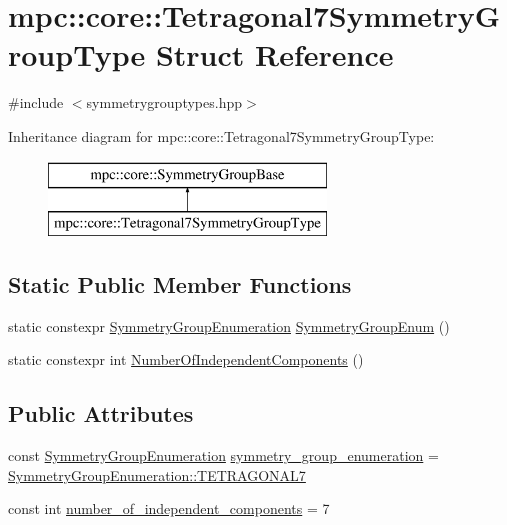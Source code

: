 \hypertarget{structmpc_1_1core_1_1_tetragonal7_symmetry_group_type}{}\section{mpc\+:\+:core\+:\+:Tetragonal7\+Symmetry\+Group\+Type Struct Reference}
\label{structmpc_1_1core_1_1_tetragonal7_symmetry_group_type}


{\ttfamily \#include $<$symmetrygrouptypes.\+hpp$>$}

Inheritance diagram for mpc\+:\+:core\+:\+:Tetragonal7\+Symmetry\+Group\+Type\+:\begin{figure}[H]
\begin{center}
\leavevmode
\includegraphics[height=2.000000cm]{structmpc_1_1core_1_1_tetragonal7_symmetry_group_type}
\end{center}
\end{figure}
\subsection*{Static Public Member Functions}
\begin{DoxyCompactItemize}
\item 
static constexpr \mbox{\hyperlink{namespacempc_1_1core_a9d979684062547055a0ef5c13077bad8}{Symmetry\+Group\+Enumeration}} \mbox{\hyperlink{structmpc_1_1core_1_1_tetragonal7_symmetry_group_type_aca4d86c79bdd3c34913d1036b4012ded}{Symmetry\+Group\+Enum}} ()
\item 
static constexpr int \mbox{\hyperlink{structmpc_1_1core_1_1_tetragonal7_symmetry_group_type_ac647e67b11ea630ae3dd9d65353b69f9}{Number\+Of\+Independent\+Components}} ()
\end{DoxyCompactItemize}
\subsection*{Public Attributes}
\begin{DoxyCompactItemize}
\item 
const \mbox{\hyperlink{namespacempc_1_1core_a9d979684062547055a0ef5c13077bad8}{Symmetry\+Group\+Enumeration}} \mbox{\hyperlink{structmpc_1_1core_1_1_tetragonal7_symmetry_group_type_aec8cb4c3907453836477cb2ed9eca6aa}{symmetry\+\_\+group\+\_\+enumeration}} = \mbox{\hyperlink{namespacempc_1_1core_a9d979684062547055a0ef5c13077bad8aea4a27c3d1e79d6a65ab91e165ba6d73}{Symmetry\+Group\+Enumeration\+::\+T\+E\+T\+R\+A\+G\+O\+N\+A\+L7}}
\item 
const int \mbox{\hyperlink{structmpc_1_1core_1_1_tetragonal7_symmetry_group_type_ad83cbb0ea09e77a87a47f0c7b542f2a3}{number\+\_\+of\+\_\+independent\+\_\+components}} = 7
\end{DoxyCompactItemize}



